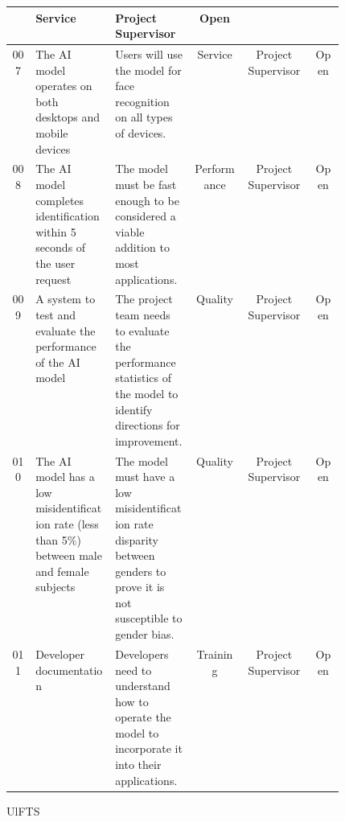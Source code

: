 {\begin{tabular}{|c|m{0.24\linewidth}|m{0.24\linewidth}|c|c|c|}
    & Service
    & Project Supervisor
    & Open \\
    \hline
    007 
    & The AI model operates on both desktops and mobile devices
    & Users will use the model for face recognition on all types of devices.
    & Service
    & Project Supervisor
    & Open \\
    \hline
    008 
    & The AI model completes identification within 5 seconds of the user request
    & The model must be fast enough to be considered a viable addition to most applications.
    & Performance
    & Project Supervisor
    & Open \\
    \hline
    009
    & A system to test and evaluate the performance of the AI model
    & The project team needs to evaluate the performance statistics of the model to identify directions for improvement.
    & Quality
    & Project Supervisor
    & Open \\
    \hline
    010
    & The AI model has a low misidentification rate (less than 5\%) between male and female subjects
    & The model must have a low misidentification rate disparity between genders to prove it is not susceptible to gender bias.
    & Quality
    & Project Supervisor
    & Open \\
    \hline
    011
    & Developer documentation 
    & Developers need to understand how to operate the model to incorporate it into their applications. 
    & Training 
    & Project Supervisor
    & Open \\
    \hline
\end{tabular}%
}{U}{l}{F}{T}{S}